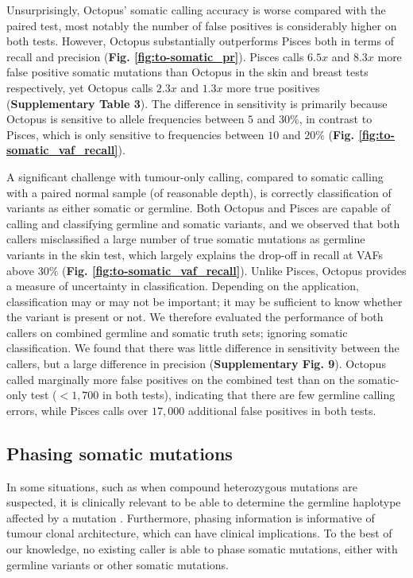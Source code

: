 \documentclass[notitlepage, twocolumn, 10pt]{article}
\begin{document}
Unsurprisingly, Octopus' somatic calling accuracy is worse compared with the paired test, most notably the number of false positives is considerably higher on both tests. However, Octopus substantially outperforms Pisces both in terms of recall and precision (\textbf{Fig. \ref{fig:to-somatic_pr}}). Pisces calls $6.5x$ and $8.3x$ more false positive somatic mutations than Octopus in the skin and breast tests respectively, yet Octopus calls $2.3x$ and $1.3x$ more true positives (\textbf{Supplementary Table 3}). The difference in sensitivity is primarily because Octopus is sensitive to allele frequencies between $5$ and $30\%$, in contrast to Pisces, which is only sensitive to frequencies between $10$ and $20\%$ (\textbf{Fig. \ref{fig:to-somatic_vaf_recall}}).

A significant challenge with tumour-only calling, compared to somatic calling with a paired normal sample (of reasonable depth), is correctly classification of variants as either somatic or germline. Both Octopus and Pisces are capable of calling and classifying germline and somatic variants, and we observed that both callers misclassified a large number of true somatic mutations as germline variants in the skin test, which largely explains the drop-off in recall at VAFs above $30\%$ (\textbf{Fig. \ref{fig:to-somatic_vaf_recall}}). Unlike Pisces, Octopus provides a measure of uncertainty in classification. Depending on the application, classification may or may not be important; it may be sufficient to know whether the variant is present or not. We therefore evaluated the performance of both callers on combined germline and somatic truth sets; ignoring somatic classification. We found that there was little difference in sensitivity between the callers, but a large difference in precision (\textbf{Supplementary Fig. 9}). Octopus called marginally more false positives on the combined test than on the somatic-only test ($<1,700$ in both tests), indicating that there are few germline calling errors, while Pisces calls over $17,000$ additional false positives in both tests.

\subsection*{Phasing somatic mutations}

In some situations, such as when compound heterozygous mutations are suspected, it is clinically relevant to be able to determine the germline haplotype affected by a mutation \cite{RN623}. Furthermore, phasing information is informative of tumour clonal architecture, which can have clinical implications. To the best of our knowledge, no existing caller is able to phase somatic mutations, either with germline variants or other somatic mutations.
\end{document}
